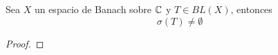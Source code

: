 \begin{teo}
    Sea $X$ un espacio de Banach sobre $\mathbb{C}$ y $T \in BL(X)$, entonces 
    $$\sigma(T) \neq \emptyset$$
\begin{proof}



















\end{proof}
\end{teo}
